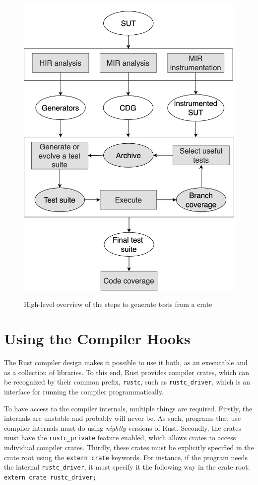 \documentclass[paper=a4,%
  twoside,%
  BCOR4mm,%
  abstract=true,%
  toc=bibliography,%
  chapterprefix=true,%
  toc=bibliographynumbered,%
  open=right,%
  english,%
  pagesize=pdftex]{scrreprt}
\begin{document}
\begin{figure}[h!]
\caption{High-level overview of the steps to generate tests from a crate}
\centering
\includegraphics[width=\textwidth]{new-overview}
\label{fig:rustyunit-overview}
\end{figure}

\section{Using the Compiler Hooks}
The Rust compiler design makes it possible to use it both, as an executable and as a collection of libraries. To this end, Rust provides compiler crates, which can be recognized by their common prefix, \lstinline{rustc}, such as \lstinline{rustc_driver}, which is an interface for running the compiler programmatically.

To have access to the compiler internals, multiple things are required. Firstly, the internals are unstable and probably will never be. As such, programs that use compiler internals must do using \textit{nightly} versions of Rust. Secondly, the crates must have the \lstinline{rustc_private} feature enabled, which allows crates to access individual compiler crates. Thirdly, these crates must be explicitly specified in the crate root using the \lstinline{extern crate} keywords. For instance, if the program needs the internal \lstinline{rustc_driver}, it must specify it the following way in the crate root: \lstinline{extern crate rustc_driver;}
\end{document}
